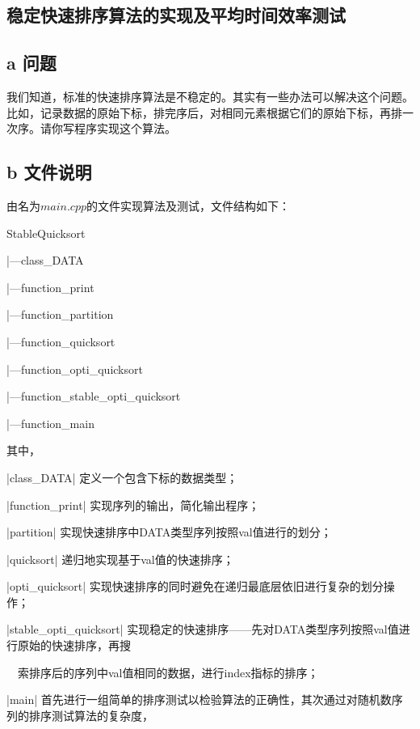 \documentclass[twoside,a4paper]{article}
\begin{document}
\begin{CJK*}{UTF8}{gkai}

\pagestyle{fancy}
\fancyhead{}


\section*{ 稳定快速排序算法的实现及平均时间效率测试}

\subsection*{a 问题} 

我们知道，标准的快速排序算法是不稳定的。其实有一些办法可以解决这个问题。比如，记录数据的原始下标，排完序后，对相同元素根据它们的原始下标，再排一次序。请你写程序实现这个算法。

\subsection*{b 文件说明}
由名为$main.cpp$的文件实现算法及测试，文件结构如下：

StableQuicksort

    |---class\_DATA

    |---function\_print
    
    |---function\_partition
    
    |---function\_quicksort
    
    |---function\_opti\_quicksort
    
    |---function\_stable\_opti\_quicksort
    
    |---function\_main
    
\noindent 其中，

|class\_DATA| 定义一个包含下标的数据类型；

|function\_print| 实现序列的输出，简化输出程序；

|partition| 实现快速排序中DATA类型序列按照val值进行的划分；

|quicksort| 递归地实现基于val值的快速排序；

|opti\_quicksort| 实现快速排序的同时避免在递归最底层依旧进行复杂的划分操作；

|stable\_opti\_quicksort| 实现稳定的快速排序——先对DATA类型序列按照val值进行原始的快速排序，再搜

\ \ 索排序后的序列中val值相同的数据，进行index指标的排序；

|main| 首先进行一组简单的排序测试以检验算法的正确性，其次通过对随机数序列的排序测试算法的复杂度，


\end{CJK*}
\end{document}
